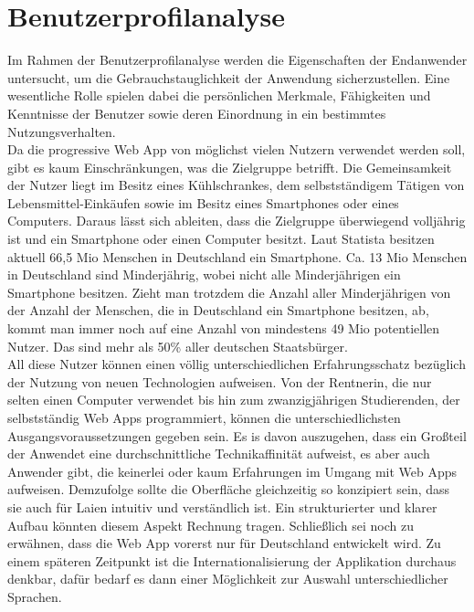 \section{Benutzerprofilanalyse}
Im Rahmen der Benutzerprofilanalyse werden die Eigenschaften der Endanwender untersucht, um die Gebrauchstauglichkeit der Anwendung sicherzustellen. Eine wesentliche
Rolle spielen dabei die persönlichen Merkmale, Fähigkeiten und Kenntnisse der Benutzer
sowie deren Einordnung in ein bestimmtes Nutzungsverhalten.\\
Da die progressive Web App von möglichst vielen Nutzern verwendet werden soll, gibt es kaum Einschränkungen, was die Zielgruppe betrifft. Die Gemeinsamkeit der Nutzer liegt im Besitz eines Kühlschrankes, dem selbstständigem Tätigen von Lebensmittel-Einkäufen sowie im Besitz eines Smartphones oder eines Computers. Daraus lässt sich ableiten, dass die Zielgruppe überwiegend volljährig ist und ein Smartphone oder einen Computer besitzt. Laut Statista besitzen aktuell 66,5 Mio Menschen in Deutschland ein Smartphone.\autocite[vgl.][]{Statista.2020} Ca. 13 Mio Menschen in Deutschland sind Minderjährig, wobei nicht alle Minderjährigen ein Smartphone besitzen. Zieht man trotzdem die Anzahl aller Minderjährigen von der Anzahl der Menschen, die in Deutschland ein Smartphone besitzen, ab, kommt man immer noch auf eine Anzahl von mindestens 49 Mio potentiellen Nutzer. Das sind  mehr als 50\% aller deutschen Staatsbürger.\\
All diese Nutzer können einen völlig unterschiedlichen Erfahrungsschatz bezüglich der Nutzung von neuen Technologien aufweisen. Von der Rentnerin, die nur selten einen Computer verwendet bis hin zum zwanzigjährigen Studierenden, der selbstständig Web Apps programmiert, können die unterschiedlichsten Ausgangsvoraussetzungen gegeben sein. Es is davon auszugehen, dass ein Großteil der Anwendet eine durchschnittliche Technikaffinität aufweist, es aber auch Anwender gibt, die keinerlei oder kaum Erfahrungen im Umgang mit Web Apps aufweisen. Demzufolge sollte die Oberfläche gleichzeitig so konzipiert sein, dass sie auch für Laien intuitiv und verständlich ist. Ein strukturierter und klarer Aufbau könnten diesem Aspekt Rechnung tragen. Schließlich sei noch zu erwähnen, dass die Web App vorerst nur für Deutschland entwickelt wird. Zu einem späteren Zeitpunkt ist die Internationalisierung der Applikation durchaus denkbar, dafür bedarf es dann einer Möglichkeit zur Auswahl unterschiedlicher Sprachen.



